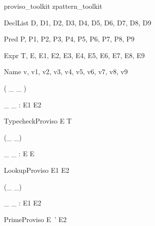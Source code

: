 \documentclass{article}
\begin{document}
\begin{zsection}
  \SECTION proviso\_toolkit \parents zpattern\_toolkit
\end{zsection}

\begin{zedjoker}{DeclList} D, D1, D2, D3, D4, D5, D6, D7, D8, D9 \end{zedjoker}
\begin{zedjoker}{Pred} P, P1, P2, P3, P4, P5, P6, P7, P8, P9 \end{zedjoker}
\begin{zedjoker}{Expr} T, E, E1, E2, E3, E4, E5, E6, E7, E8, E9 \end{zedjoker}
\begin{zedjoker}{Name} v, v1, v2, v3, v4, v5, v6, v7, v8, v9 \end{zedjoker}


\begin{zed}
  \relation ( \_ \hasType \_ )
\end{zed}

\begin{gendef}[E1,E2]
  \_ \hasType \_ : E1 \rel E2
\end{gendef}

\begin{zedproviso}{TypecheckProviso}
  E \hasType T
\end{zedproviso}




\begin{zed}
  \relation (\_ \hasDefn \_)
\end{zed}

\begin{gendef}[E]
  \_ \hasDefn \_ : E \rel E
\end{gendef}

\begin{zedproviso}{LookupProviso}
  E1 \hasDefn E2
\end{zedproviso}




\begin{zed}
  \relation (\_ \is \_)
\end{zed}

\begin{gendef}[E1,E2]
  \_ \is \_ : E1 \rel E2
\end{gendef}

\begin{zedproviso}{PrimeProviso}
  E~' \is E2
\end{zedproviso}
\end{document}

